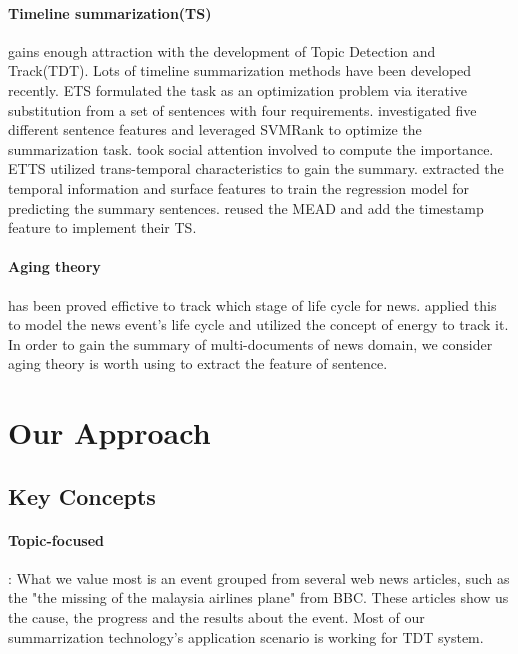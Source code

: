 \documentclass{llncs}
\begin{document}
\paragraph{Timeline summarization(TS)} gains enough attraction with the development of Topic Detection and Track(TDT). Lots of timeline summarization methods have been developed recently. ETS \cite{2011-Yan-p745-754} formulated the task as an optimization  problem via iterative substitution from a set of sentences with four requirements. \cite{tran2013leveraging} investigated five different sentence features and leveraged SVMRank to optimize the summarization task. \cite{zhao2013timeline} took social attention involved to compute the importance. ETTS \cite{Yan:2011:TGT:2145432.2145483} utilized trans-temporal characteristics to gain the summary. \cite{binh2013structured} extracted the temporal information and surface features to train the regression model for predicting the summary sentences. \cite{2008-Nedunchelian-p480-485} reused the MEAD and add the timestamp feature to implement their TS.
 
\paragraph{Aging theory} has been proved effictive to track which stage of life cycle for news. \cite{2007-Chen-p1016-1025} \cite{chen2003life} applied this to model the news event's life cycle and utilized the concept of energy to track it. In order to gain the summary of multi-documents of news domain, we consider aging theory is worth using to extract the feature of sentence.

%
\section{Our Approach}
%

\subsection{Key Concepts}
\paragraph{Topic-focused}: What we value most is an event grouped from several web news articles, such as the "the missing of the malaysia airlines plane" from BBC. These articles show us the cause, the progress and the results about the event. Most of our summarrization technology's application scenario is working for TDT system. 
\end{document}
